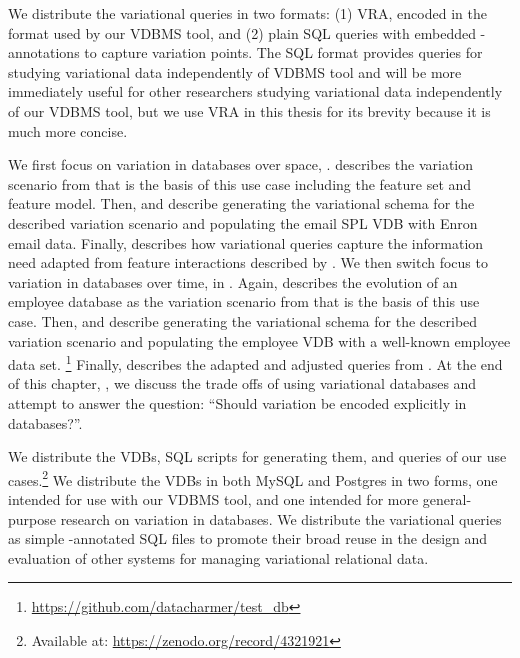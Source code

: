 We distribute the variational queries in two formats: (1) VRA,
encoded in the format used by
our VDBMS tool, and (2) plain SQL queries with embedded 
-annotations to capture variation points.
%
The SQL format provides queries for studying variational data 
independently of VDBMS tool and
will be more immediately useful for other researchers
studying variational data independently of our VDBMS tool, 
but we use VRA in
this thesis for its brevity
because it is much more concise.


We first focus on variation in databases over space, 
.  describes the
variation scenario from \citet{Hall05} that is the basis of this use case including the feature set and
feature model. Then,  and  describe generating the variational schema for the described
variation scenario and populating the email SPL VDB with Enron email data.
Finally,  describes how variational queries capture the information need 
adapted from feature interactions described by \citet{Hall05}.
%
We then switch focus to variation in databases over time,
in . Again,  describes the
evolution of an employee database as the variation scenario from \citet{prima08Moon} 
that is the basis of this use case.
Then,  and  describe generating the variational 
schema for the described
variation scenario and populating the employee VDB with a well-known employee data set.%
\footnote{\url{https://github.com/datacharmer/test_db}}
Finally,  describes the adapted and adjusted queries from \citet{prima08Moon}. 
%
At the end of this chapter, , we discuss the trade offs of using variational databases and
attempt to answer the question: ``Should variation be encoded explicitly in databases?''.

We distribute the VDBs, SQL scripts for generating them, and queries of our
use cases.\footnote{Available at: \url{https://zenodo.org/record/4321921}}
%
We distribute the VDBs in both MySQL and Postgres in two forms, one intended
for use with our VDBMS tool, and one intended for more general-purpose research
on variation in databases.
%
%
We distribute the variational queries as simple -annotated SQL files
to promote their broad reuse in the design and evaluation of other systems for
managing variational relational data.

%







